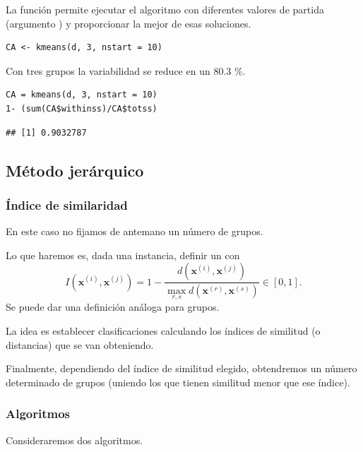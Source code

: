 La función  permite ejecutar el algoritmo con diferentes valores de partida (argumento ) y proporcionar la mejor de esas soluciones.
\begin{lstlisting}
CA <- kmeans(d, 3, nstart = 10)
\end{lstlisting}
Con tres grupos la variabilidad se reduce en un 80.3 \%.
\begin{lstlisting}
CA = kmeans(d, 3, nstart = 10)
1- (sum(CA$withinss)/CA$totss)
\end{lstlisting}
\begin{verbatim}
## [1] 0.9032787
\end{verbatim}
\subsection{Método jerárquico}
\subsubsection{Índice de similaridad}
En este caso no fijamos de antemano un número de grupos.

Lo que haremos es, dada una instancia, definir un  con \[ I(\mathbf{x}^{(i)},\mathbf{x}^{(j)})=1-\dfrac{d(\mathbf{x}^{(i)},\mathbf{x}^{(j)})}{\displaystyle\max_{r,s}d(\mathbf{x}^{(r)},\mathbf{x}^{(s)})}\in[0,1]. \]
Se puede dar una definición análoga para grupos.

La idea es establecer clasificaciones calculando los índices de similitud (o distancias) que se van obteniendo.

Finalmente, dependiendo del índice de similitud elegido, obtendremos un número determinado de grupos (uniendo los que tienen similitud menor que ese índice).

\subsubsection{Algoritmos}
Consideraremos dos algoritmos.

